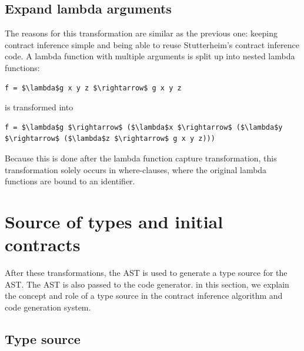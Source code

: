 \documentclass[10pt]{report}
\begin{document}
\subsection{Expand lambda arguments}
The reasons for this transformation are similar as the previous one: keeping contract inference simple and being able to reuse Stutterheim's contract inference code.
A lambda function with multiple arguments is split up into nested lambda functions:

\begin{lstlisting}[mathescape]
f = $\lambda$g x y z $\rightarrow$ g x y z
\end{lstlisting}

is transformed into

\begin{lstlisting}[caption=Result of lambda argument expansion transformation.,mathescape]
f = $\lambda$g $\rightarrow$ ($\lambda$x $\rightarrow$ ($\lambda$y $\rightarrow$ ($\lambda$z $\rightarrow$ g x y z)))
\end{lstlisting}

Because this is done after the lambda function capture transformation, this transformation solely occurs in where-clauses, where the original lambda functions are bound to an identifier.

\section{Source of types and initial contracts}
\label{sourceoftypes}
After these transformations, the AST is used to generate a type source for the AST.
The AST is also passed to the code generator.
in this section, we explain the concept and role of a type source in the contract inference algorithm and code generation system.

\subsection{Type source}

\end{document}
